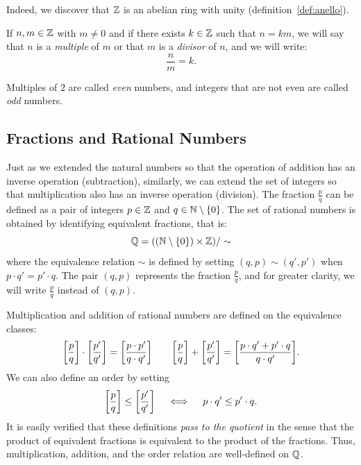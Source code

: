 Indeed, we discover that ${\mathbb Z}$ is an abelian ring with unity
(definition~\ref{def:anello}).

If $n,m\in{\mathbb Z}$ with $m\neq 0$ and if there exists $k\in{\mathbb Z}$ such that $n=km$, we
will say that $n$ is a \emph{multiple} of $m$ or that $m$ is a \emph{divisor} of
$n$, and we will write:
\[
  \frac{n}{m} = k.  
\]

Multiples of $2$ are called \emph{even} numbers, and integers that are not even
are called \emph{odd} numbers.

\subsection{Fractions and Rational Numbers}

Just as we extended the natural numbers so that the operation of addition has an
inverse operation (subtraction), similarly, we can extend the set of integers so
that multiplication also has an inverse operation (division). The fraction
$\frac p q$ can be defined as a pair of integers $p\in {\mathbb Z}$ and $q\in
{\mathbb N}\setminus {\left\{ 0 \right\}}$. The set of rational numbers is obtained by identifying
equivalent fractions, that is:
\[
  {\mathbb Q} = (({\mathbb N} \setminus{\left\{ 0 \right\}})\times {\mathbb Z})/\sim  
\]
where the equivalence relation $\sim$ is defined by setting $(q,p) \sim (q',p')$
when $p\cdot q' = p'\cdot q$. The pair $(q,p)$ represents the fraction $\frac p
q$, and for greater clarity, we will write $\frac p q$ instead of $(q,p)$.

%
Multiplication and addition of rational numbers are defined on the equivalence
classes:
\[
 {\left[ \frac p q \right]} \cdot {\left[ \frac{p'}{q'} \right]} 
 = {\left[ \frac{p\cdot p'}{q\cdot q'} \right]} 
 \qquad 
 {\left[ \frac{p}{q} \right]} + {\left[ \frac{p'}{q'} \right]} 
 = {\left[ \frac{p\cdot q' + p'\cdot q}{q\cdot q'} \right]}.
\]
We can also define an order by setting
\[
 {\left[ \frac p q \right]} \le {\left[ \frac{p'}{q'} \right]}
 \quad\iff  \quad p \cdot q' \le p' \cdot q.
\]
It is easily verified that these definitions \emph{pass to the quotient} in the
sense that the product of equivalent fractions is equivalent to the product of
the fractions. Thus, multiplication, addition, and the order relation are
well-defined on ${\mathbb Q}$.

